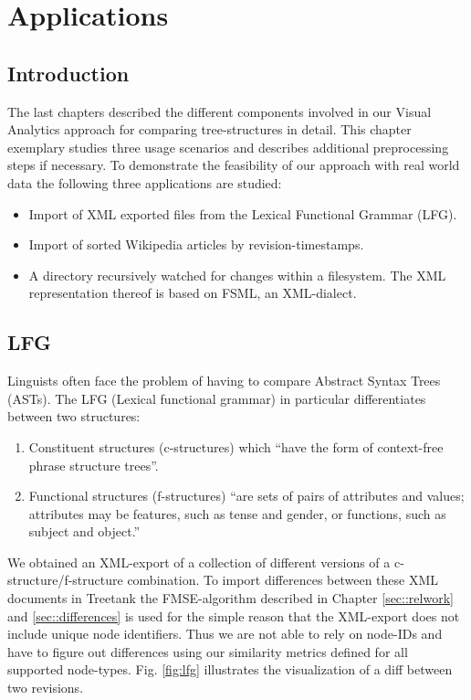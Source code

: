 \section{Applications}\label{sec::applications}
\subsection{Introduction}
The last chapters described the different components involved in our Visual Analytics approach for comparing tree-structures in detail. This chapter exemplary studies three usage scenarios and describes additional preprocessing steps if necessary. To demonstrate the feasibility of our approach with real world data the following three applications are studied:

\begin{itemize}
\item Import of XML exported files from the Lexical Functional Grammar (LFG).
\item Import of sorted Wikipedia articles by revision-timestamps. 
\item A directory recursively watched for changes within a filesystem. The XML representation thereof is based on FSML\cite{FSML}, an XML-dialect. 
\end{itemize}

\subsection{LFG}
Linguists often face the problem of having to compare Abstract Syntax Trees (ASTs). The LFG (Lexical functional grammar) in particular differentiates between two structures:

\begin{enumerate}
\item{Constituent structures (c-structures)} which ``have the form of context-free phrase structure trees''.
\item{Functional structures (f-structures)} ``are sets of pairs of attributes and values; attributes may be features, such as tense and gender, or functions, such as subject and object.''\cite{LFG}
\end{enumerate}

We obtained an XML-export of a collection of different versions of a c-structure/f-structure combination. To import differences between these XML documents in Treetank the FMSE-algorithm described in Chapter \ref{sec::relwork} and \ref{sec::differences} is used for the simple reason that the XML-export does not include unique node identifiers. Thus we are not able to rely on node-IDs and have to figure out differences using our similarity metrics defined for all supported node-types. Fig. \ref{fig:lfg} illustrates the visualization of a diff between two revisions.

